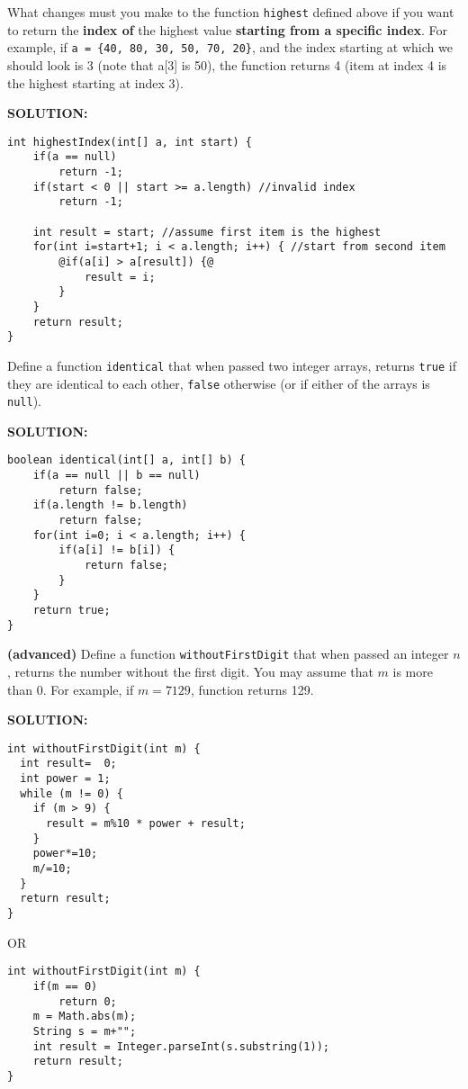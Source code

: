 \documentclass[11pt]{exam}
\begin{document}
\begin{questions}
\question What changes must you make to the function \texttt{highest} defined above if you want to return the \textbf{index of} the highest value \textbf{starting from a specific index}. For example, if \texttt{a = \{40, 80, 30, 50, 70, 20\}}, and the index starting at which we should look is 3 (note that a[3] is 50), the function returns 4 (item at index 4 is the highest starting at index 3).

\ifprintanswers \vskip 1cm \textbf{SOLUTION:} \vskip 1cm
\begin{lstlisting}[numbers=none, frame=single ,style=buggy]
int highestIndex(int[] a, int start) {
	if(a == null)
		return -1;
	if(start < 0 || start >= a.length) //invalid index
		return -1;
		
	int result = start; //assume first item is the highest
	for(int i=start+1; i < a.length; i++) { //start from second item
		@if(a[i] > a[result]) {@
			result = i;
		}
	}
	return result;
}	
\end{lstlisting}
\newpage \else
\newpage
\fi


\question Define a function \texttt{identical} that when passed two integer arrays, returns \texttt{true} if they are identical to each other, \texttt{false} otherwise (or if either of the arrays is \texttt{null}).

\ifprintanswers \vskip 1cm \textbf{SOLUTION:} \vskip 1cm
\begin{lstlisting}[numbers=none, frame=single ,style=buggy]
boolean identical(int[] a, int[] b) {
	if(a == null || b == null)
		return false;
	if(a.length != b.length)
		return false;
	for(int i=0; i < a.length; i++) {
		if(a[i] != b[i]) {
			return false;
		}
	}
	return true;
}	
\end{lstlisting}
\newpage \else
\vskip 10cm
\fi

\question \textbf{(advanced)}
Define a function \texttt{withoutFirstDigit} that when passed an integer $n$, returns the number without the first digit. You may assume that $m$ is more than 0. For example, if $m=7129$, function returns 129.

\ifprintanswers \vskip 1cm \textbf{SOLUTION:} \vskip 1cm
\begin{lstlisting}
int withoutFirstDigit(int m) {
  int result=  0;
  int power = 1;
  while (m != 0) {
    if (m > 9) {
      result = m%10 * power + result;
    }
    power*=10;
    m/=10;
  }
  return result;
}
\end{lstlisting}
OR
\begin{lstlisting}
int withoutFirstDigit(int m) {
	if(m == 0)
		return 0;
	m = Math.abs(m);
	String s = m+"";
	int result = Integer.parseInt(s.substring(1));
	return result;
}
\end{lstlisting}
\newpage \else
\newpage
\fi


\end{questions}
\end{document}

